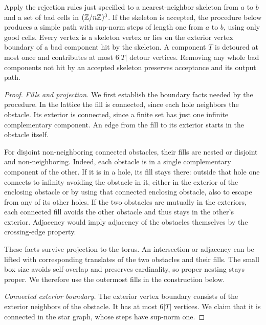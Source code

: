 \begin{lemma}\label{lem:detour}
Apply the rejection rules just specified to a nearest-neighbor skeleton
from $a$ to $b$ and a set of bad cells in $(\mathbb Z/n\mathbb Z)^3$. If the skeleton
is accepted, the procedure below produces a simple path with sup-norm
steps of length one from $a$ to $b$, using only good cells. Every vertex
is a skeleton vertex or lies on the exterior vertex boundary of a bad
component hit by the skeleton. A component $T$ is detoured at most once
and contributes at most $6|T|$ detour vertices. Removing any whole bad
components not hit by an accepted skeleton preserves acceptance and its
output path.
\end{lemma}
\begin{proof}
\emph{Fills and projection.}
We first establish the boundary facts needed by the procedure.
In the lattice the fill is connected, since each hole neighbors
the obstacle. Its exterior is connected, since a finite set has
just one infinite complementary component. An edge from the fill
to its exterior starts in the obstacle itself.

For disjoint non-neighboring connected obstacles, their fills
are nested or disjoint and non-neighboring. Indeed, each obstacle
is in a single complementary component of the other. If it is in
a hole, its fill stays there: outside that hole one connects to
infinity avoiding the obstacle in it, either in the exterior of
the enclosing obstacle or by using that connected enclosing
obstacle, also to escape from any of its other holes. If the two
obstacles are mutually in the exteriors, each connected fill
avoids the other obstacle and thus stays in the other's exterior.
Adjacency would imply adjacency of the obstacles themselves by
the crossing-edge property.

These facts survive projection to the torus. An intersection or
adjacency can be lifted with corresponding translates of the two
obstacles and their fills. The small box size avoids self-overlap
and preserves cardinality, so proper nesting stays proper. We
therefore use the outermost fills in the construction below.

\emph{Connected exterior boundary.}
The exterior vertex boundary consists of the exterior neighbors
of the obstacle. It has at most \(6|T|\) vertices. We claim that
it is connected in the star graph, whose steps have sup-norm one.


\end{proof}
